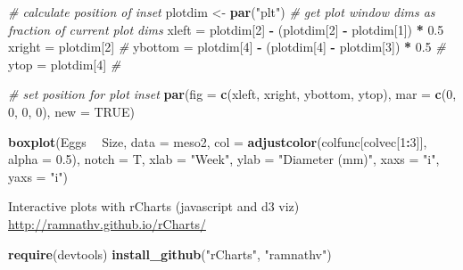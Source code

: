 \documentclass[10,portrait]{article}
\newenvironment{Shaded}{\begin{snugshade}}{\end{snugshade}}
\newcommand{\KeywordTok}[1]{\textcolor[rgb]{0.13,0.29,0.53}{\textbf{#1}}}
\newcommand{\DataTypeTok}[1]{\textcolor[rgb]{0.13,0.29,0.53}{#1}}
\newcommand{\DecValTok}[1]{\textcolor[rgb]{0.00,0.00,0.81}{#1}}
\newcommand{\FloatTok}[1]{\textcolor[rgb]{0.00,0.00,0.81}{#1}}
\newcommand{\StringTok}[1]{\textcolor[rgb]{0.31,0.60,0.02}{#1}}
\newcommand{\CommentTok}[1]{\textcolor[rgb]{0.56,0.35,0.01}{\textit{#1}}}
\newcommand{\OtherTok}[1]{\textcolor[rgb]{0.56,0.35,0.01}{#1}}
\newcommand{\OperatorTok}[1]{\textcolor[rgb]{0.81,0.36,0.00}{\textbf{#1}}}
\newcommand{\NormalTok}[1]{#1}
\begin{document}
\begin{Shaded}
\begin{Highlighting}[]
\CommentTok{# calculate position of inset}
\NormalTok{plotdim <-}\StringTok{ }\KeywordTok{par}\NormalTok{(}\StringTok{"plt"}\NormalTok{)  }\CommentTok{# get plot window dims as fraction of current plot dims }
\NormalTok{xleft =}\StringTok{ }\NormalTok{plotdim[}\DecValTok{2}\NormalTok{] }\OperatorTok{-}\StringTok{ }\NormalTok{(plotdim[}\DecValTok{2}\NormalTok{] }\OperatorTok{-}\StringTok{ }\NormalTok{plotdim[}\DecValTok{1}\NormalTok{]) }\OperatorTok{*}\StringTok{ }\FloatTok{0.5}
\NormalTok{xright =}\StringTok{ }\NormalTok{plotdim[}\DecValTok{2}\NormalTok{]  }\CommentTok{#}
\NormalTok{ybottom =}\StringTok{ }\NormalTok{plotdim[}\DecValTok{4}\NormalTok{] }\OperatorTok{-}\StringTok{ }\NormalTok{(plotdim[}\DecValTok{4}\NormalTok{] }\OperatorTok{-}\StringTok{ }\NormalTok{plotdim[}\DecValTok{3}\NormalTok{]) }\OperatorTok{*}\StringTok{ }
\StringTok{    }\FloatTok{0.5}  \CommentTok{#}
\NormalTok{ytop =}\StringTok{ }\NormalTok{plotdim[}\DecValTok{4}\NormalTok{]  }\CommentTok{#}

\CommentTok{# set position for plot inset}
\KeywordTok{par}\NormalTok{(}\DataTypeTok{fig =} \KeywordTok{c}\NormalTok{(xleft, xright, ybottom, ytop), }\DataTypeTok{mar =} \KeywordTok{c}\NormalTok{(}\DecValTok{0}\NormalTok{, }
    \DecValTok{0}\NormalTok{, }\DecValTok{0}\NormalTok{, }\DecValTok{0}\NormalTok{), }\DataTypeTok{new =} \OtherTok{TRUE}\NormalTok{)}

\KeywordTok{boxplot}\NormalTok{(Eggs }\OperatorTok{~}\StringTok{ }\NormalTok{Size, }\DataTypeTok{data =}\NormalTok{ meso2, }\DataTypeTok{col =} \KeywordTok{adjustcolor}\NormalTok{(colfunc[colvec[}\DecValTok{1}\OperatorTok{:}\DecValTok{3}\NormalTok{]], }
    \DataTypeTok{alpha =} \FloatTok{0.5}\NormalTok{), }\DataTypeTok{notch =}\NormalTok{ T, }\DataTypeTok{xlab =} \StringTok{"Week"}\NormalTok{, }\DataTypeTok{ylab =} \StringTok{"Diameter (mm)"}\NormalTok{, }
    \DataTypeTok{xaxs =} \StringTok{"i"}\NormalTok{, }\DataTypeTok{yaxs =} \StringTok{"i"}\NormalTok{)}
\end{Highlighting}
\end{Shaded}

Interactive plots with rCharts (javascript and d3 viz)\\
\url{http://ramnathv.github.io/rCharts/}

\begin{Shaded}
\begin{Highlighting}[]
\KeywordTok{require}\NormalTok{(devtools)}
\KeywordTok{install_github}\NormalTok{(}\StringTok{"rCharts"}\NormalTok{, }\StringTok{"ramnathv"}\NormalTok{)}
\end{Highlighting}
\end{Shaded}
\end{document}
